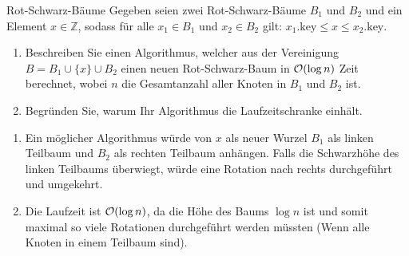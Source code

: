 \documentclass{article}
\begin{document}
\begin{exercise}{Rot-Schwarz-Bäume}
  Gegeben seien zwei Rot-Schwarz-Bäume $B_1$ und $B_2$ und ein Element $x \in \mathbb{Z}$, sodass für alle $x_1 \in B_1$ und $x_2 \in B_2$ gilt: $x_1.\text{key} \leq x \leq x_2.\text{key}$.
  \begin{enumerate}
    \item Beschreiben Sie einen Algorithmus, welcher aus der Vereinigung $B = B_1 \cup \{x\} \cup B_2$ einen neuen Rot-Schwarz-Baum in $\mathcal{O}(\log n)$ Zeit berechnet, wobei $n$ die Gesamtanzahl aller Knoten in $B_1$ und $B_2$ ist.
    \item Begründen Sie, warum Ihr Algorithmus die Laufzeitschranke einhält.
  \end{enumerate}

  \begin{solution}
    \begin{enumerate}
      \item Ein möglicher Algorithmus würde von $x$ als neuer Wurzel $B_1$ als linken Teilbaum und $B_2$ als rechten Teilbaum anhängen. Falls die Schwarzhöhe des linken Teilbaums überwiegt, würde eine Rotation nach rechts durchgeführt und umgekehrt.
      \item Die Laufzeit ist $\mathcal{O}(\log n)$, da die Höhe des Baums $\log n$ ist und somit maximal so viele Rotationen durchgeführt werden müssten (Wenn alle Knoten in einem Teilbaum sind).
    \end{enumerate}
  \end{solution}
\end{exercise}
\end{document}
